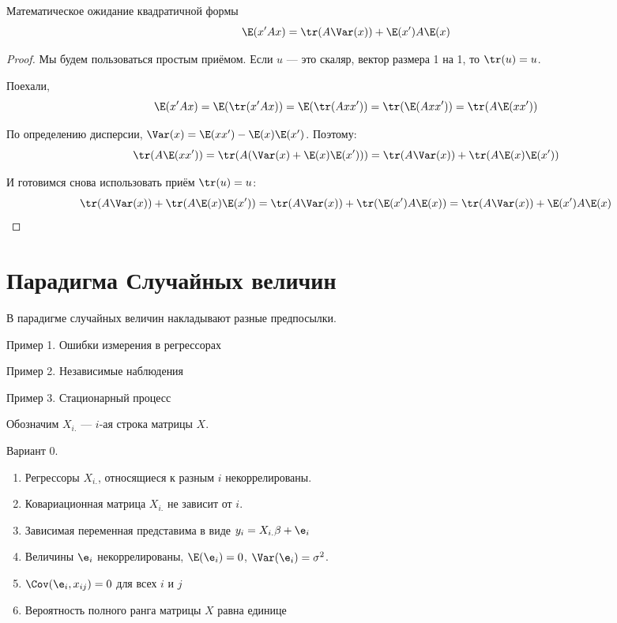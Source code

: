 \documentclass[pdftex,12pt,a4paper]{article}
\begin{document}
\begin{theorem}
Математическое ожидание квадратичной формы
\begin{equation}
\E(x'Ax)=\tr(A\Var(x))+\E(x')A\E(x)
\end{equation}
\end{theorem}
\begin{proof}
Мы будем пользоваться простым приёмом. Если $u$ --- это скаляр, вектор размера 1 на 1, то $\tr(u)=u$.

Поехали,
\begin{equation}
\E(x'Ax)=\E(\tr(x'Ax))=\E(\tr(Axx'))=\tr(\E(Axx'))=\tr(A\E(xx'))
\end{equation}

По определению дисперсии, $\Var(x)=\E(xx')-\E(x)\E(x')$. Поэтому:
\begin{equation}
\tr(A\E(xx'))=\tr(A(\Var(x)+\E(x)\E(x')))=\tr(A\Var(x))+\tr(A\E(x)\E(x'))
\end{equation}

И готовимся снова использовать приём $\tr(u)=u$:
\begin{equation}
\tr(A\Var(x))+\tr(A\E(x)\E(x'))=\tr(A\Var(x))+\tr(\E(x')A\E(x))=
\tr(A\Var(x))+\E(x')A\E(x)
\end{equation}

\end{proof}


\section{Парадигма Случайных величин}

В парадигме случайных величин накладывают разные предпосылки.


Пример 1. Ошибки измерения в регрессорах


Пример 2. Независимые наблюдения


Пример 3. Стационарный процесс




Обозначим $X_{i.}$ --- $i$-ая строка матрицы $X$.

Вариант 0.

\begin{enumerate}
\item Регрессоры $X_{i.}$, относящиеся к разным $i$ некоррелированы.
\item Ковариационная матрица $X_{i.}$ не зависит от $i$.
\item Зависимая переменная представима в виде $y_i=X_{i.}\beta+\e_i$
\item Величины $\e_i$ некоррелированы, $\E(\e_i)=0$, $\Var(\e_i)=\sigma^2$.
\item $\Cov(\e_i,x_{ij})=0$ для всех $i$ и $j$
\item Вероятность полного ранга матрицы $X$ равна единице
\end{enumerate}
\end{document}
